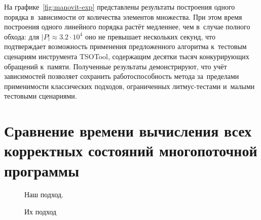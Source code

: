 На графике~\ref{fig:manovit-exp} представлены результаты построения
одного порядка в~зависимости от количества элементов множества.
При этом время построения одного
линейного порядка растёт медленнее, чем в~случае полного
обхода: для $|P| \approx 3.2 \cdot 10^4$ оно не превышает нескольких
секунд, что подтверждает возможность применения предложенного
алгоритма к~тестовым сценариям инструмента TSOTool, содержащим
десятки тысяч конкурирующих обращений к~памяти. Полученные результаты
демонстрируют, что учёт зависимостей позволяет сохранить
работоспособность метода за~пределами применимости классических
подходов, ограниченных литмус-тестами и~малыми тестовыми сценариями.

\section{Сравнение времени вычисления всех корректных состояний
многопоточной программы}
\label{sec:ch5/litmus-comparison}



\begin{minipage}[ht]{0.3\textwidth}
  \centering
  
\end{minipage}
\begin{minipage}[ht]{0.7\textwidth}
  \centering
  
\end{minipage}

\begin{figure}[htbp]
  \centering
  
  \caption{Наш подход.}
  \label{fig:our-approach-time}
\end{figure}

\begin{figure}[htbp]
  \centering
  
  \caption{Их подход}
  \label{fig:their-approach-time}
\end{figure}

